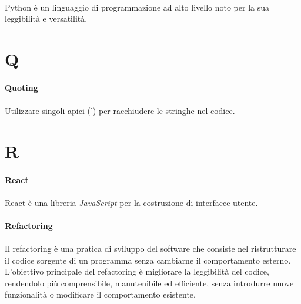 \documentclass[10pt, a4paper]{article}
\begin{document}
\paragraph{}Python è un linguaggio di programmazione ad alto livello noto per la sua leggibilità e versatilità.


\newpage
\section{Q}
\vspace{2em}
\paragraph{Quoting}\noindent\hrulefill
\paragraph{}Utilizzare singoli apici (') per racchiudere le stringhe nel codice.


\newpage
\section{R}
\vspace{2em}
\paragraph{React}\noindent\hrulefill
\paragraph{}React è una libreria \textit{JavaScript\pg} per la costruzione di interfacce utente.

\vspace{2em}
\paragraph{Refactoring}\noindent\hrulefill
\paragraph{}Il refactoring è una pratica di sviluppo del software che consiste nel ristrutturare il codice sorgente di un programma senza cambiarne il comportamento esterno. L'obiettivo principale del refactoring è migliorare la leggibilità del codice, rendendolo più comprensibile, manutenibile ed efficiente, senza introdurre nuove funzionalità o modificare il comportamento esistente.
\end{document}
